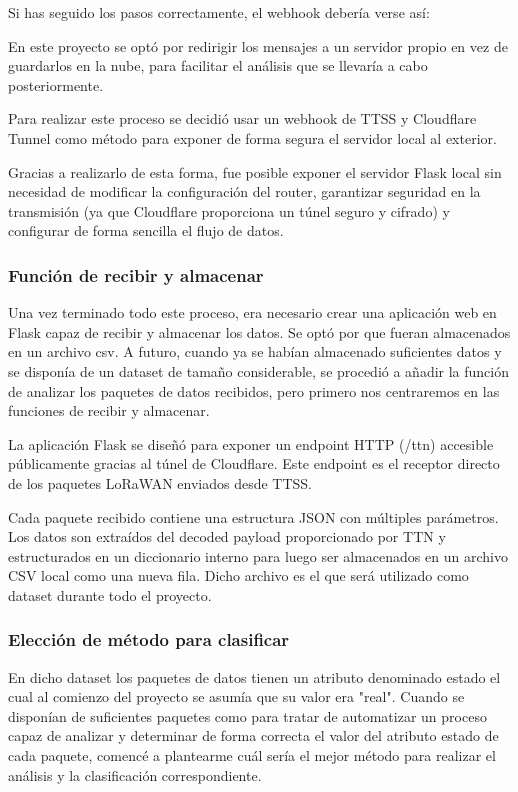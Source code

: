 Si has seguido los pasos correctamente, el webhook debería verse así:



En este proyecto se optó por redirigir los mensajes a un servidor propio en vez de guardarlos en la nube, para facilitar el análisis que se llevaría a cabo posteriormente.

Para realizar este proceso se decidió usar un webhook de TTSS y Cloudflare Tunnel como método para exponer de forma segura el servidor local al exterior.

Gracias a realizarlo de esta forma, fue posible exponer el servidor Flask local sin necesidad de modificar la configuración del router, garantizar seguridad en la transmisión (ya que Cloudflare proporciona un túnel seguro y cifrado) y configurar de forma sencilla el flujo de datos. 

\subsubsection{Función de recibir y almacenar}

Una vez terminado todo este proceso, era necesario crear una aplicación web en Flask capaz de recibir y almacenar los datos. Se optó por que fueran almacenados en un archivo csv. A futuro, cuando ya se habían almacenado suficientes datos y se disponía de un dataset de tamaño considerable, se procedió a añadir la función de analizar los paquetes de datos recibidos, pero primero nos centraremos en las funciones de recibir y almacenar.

La aplicación Flask se diseñó para exponer un endpoint HTTP (/ttn) accesible públicamente gracias al túnel de Cloudflare. Este endpoint es el receptor directo de los paquetes LoRaWAN enviados desde TTSS.

Cada paquete recibido contiene una estructura JSON con múltiples parámetros. Los datos son extraídos del decoded payload proporcionado por TTN y estructurados en un diccionario interno para luego ser almacenados en un archivo CSV local como una nueva fila. Dicho archivo es el que será utilizado como dataset durante todo el proyecto.

\subsubsection{Elección de método para clasificar}

En dicho dataset los paquetes de datos tienen un atributo denominado estado el cual al comienzo del proyecto se asumía que su valor era "real". Cuando se disponían de suficientes paquetes como para tratar de automatizar un proceso capaz de analizar y determinar de forma correcta el valor del atributo estado de cada paquete, comencé a plantearme cuál sería el mejor método para realizar el análisis y la clasificación correspondiente.

